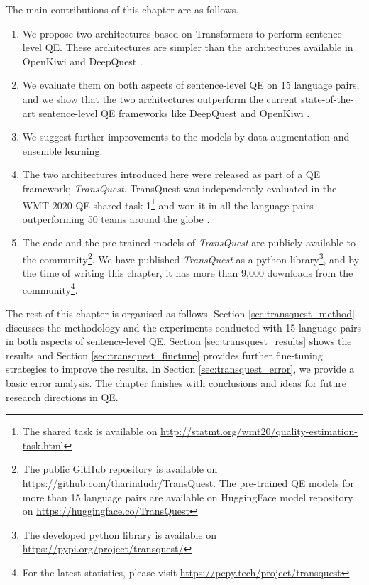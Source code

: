      
The main contributions of this chapter are as follows.
\begin{enumerate}
	\item We propose two architectures based on Transformers to perform sentence-level QE. These architectures are simpler than the architectures available in OpenKiwi and DeepQuest \autocite{lee-2020-two, wang-etal-2018-alibaba}. 
	
	\item We evaluate them on both aspects of sentence-level QE on 15 language pairs, and we show that the two architectures outperform the current state-of-the-art sentence-level QE frameworks like DeepQuest \autocite{ive-etal-2018-deepquest} and OpenKiwi \autocite{kepler-etal-2019-openkiwi}.
	
	\item We suggest further improvements to the models by data augmentation and ensemble learning.
		
	\item The two architectures introduced here were released as part of a QE framework; \textit{TransQuest}. TransQuest was independently evaluated in the WMT 2020 QE shared task 1\footnote{The shared task is available on \url{http://statmt.org/wmt20/quality-estimation-task.html}} \autocite{specia-etal-2020-findings-wmt} and won it in all the language pairs outperforming 50 teams around the globe \autocite{ranasinghe-etal-2020-transquest-wmt2020}.
	
	\item The code and the pre-trained models of \textit{TransQuest} are publicly available to the community\footnote{The public GitHub repository is available on \url{https://github.com/tharindudr/TransQuest}. The pre-trained QE models for more than 15 language pairs are available on HuggingFace model repository on \url{https://huggingface.co/TransQuest}}. We have published \textit{TransQuest} as a python library\footnote{The developed python library is available on \url{https://pypi.org/project/transquest/}}, and by the time of writing this chapter, it has more than 9,000 downloads from the community\footnote{For the latest statistics, please visit \url{https://pepy.tech/project/transquest}}. 
	
\end{enumerate}

The rest of this chapter is organised as follows. Section \ref{sec:transquest_method} discusses the methodology and the experiments conducted with 15 language pairs in both aspects of sentence-level QE.  Section \ref{sec:transquest_results} shows the results and Section \ref{sec:transquest_finetune} provides further fine-tuning strategies to improve the results. In Section \ref{sec:transquest_error}, we provide a basic error analysis. The chapter finishes with conclusions and ideas for future research directions in QE.

